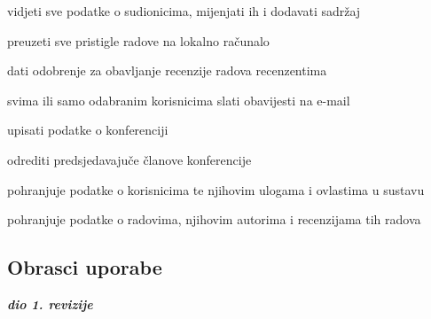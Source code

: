 \begin{packed_enum}
\begin{packed_enum}
					
				\end{packed_enum}
				
				\item  {}
				
				\begin{packed_enum}
				
					\item vidjeti sve podatke o sudionicima, mijenjati ih i dodavati sadržaj
					\item preuzeti sve pristigle radove na lokalno računalo
					\item dati odobrenje za obavljanje recenzije radova recenzentima
					\item svima ili samo odabranim korisnicima slati obavijesti na e-mail
				
				\end{packed_enum}
				
				\item  {}
				
				\begin{packed_enum}
				
					\item upisati podatke o konferenciji
					\item odrediti predsjedavajuče članove konferencije
				\end{packed_enum}

				\item {}

				\begin{packed_enum}

					\item pohranjuje podatke o korisnicima te njihovim ulogama i ovlastima u sustavu
					\item pohranjuje podatke o radovima, njihovim autorima i recenzijama tih radova

				\end{packed_enum}
					
			\end{packed_enum}
			
			\eject 
			
			
				
			\subsection{Obrasci uporabe}
				
				\textbf{\textit{dio 1. revizije}}
				
